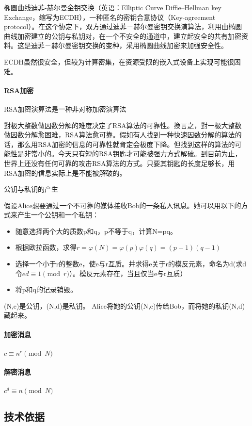 \documentclass{ctexart}
\begin{document}
椭圆曲线迪菲-赫尔曼金钥交换（英语：Elliptic Curve Diffie–Hellman key Exchange，缩写为ECDH），一种匿名的密钥合意协议（Key-agreement protocol）。在这个协定下，双方通过迪菲－赫尔曼密钥交换演算法，利用由椭圆曲线加密建立的公钥与私钥对，在一个不安全的通道中，建立起安全的共有加密资料。这是迪菲－赫尔曼密钥交换的变种，采用椭圆曲线加密来加强安全性。

ECDH虽然很安全，但较为计算密集，在资源受限的嵌入式设备上实现可能很困难。

\paragraph{RSA加密}
RSA加密演算法是一种非对称加密演算法

對极大整数做因数分解的难度决定了RSA算法的可靠性。換言之，對一极大整数做因数分解愈困难，RSA算法愈可靠。假如有人找到一种快速因数分解的算法的话，那么用RSA加密的信息的可靠性就肯定会极度下降。但找到这样的算法的可能性是非常小的。今天只有短的RSA钥匙才可能被强力方式解破。到目前为止，世界上还没有任何可靠的攻击RSA算法的方式。只要其钥匙的长度足够长，用RSA加密的信息实际上是不能被解破的。

公钥与私钥的产生

假设Alice想要通过一个不可靠的媒体接收Bob的一条私人讯息。她可以用以下的方式来产生一个公钥和一个私钥：

\begin{itemize}
	\item 随意选择两个大的质数p和q，p不等于q，计算N=pq。
	\item 根据欧拉函数，求得$r=\varphi (N) = \varphi (p)\varphi (q)=(p-1)(q-1)$
	\item 选择一个小于r的整数e，使e与r互质。并求得e关于r的模反元素，命名为d(求d令${\displaystyle ed\equiv 1{\pmod{r}}}$）。模反元素存在，当且仅当e与r互质）
	\item 将p和q的记录销毁。
\end{itemize}

(N,e)是公钥，(N,d)是私钥。 Alice将她的公钥(N,e)传给Bob，而将她的私钥(N,d)藏起来。

\paragraph{加密消息}
${\displaystyle c\equiv n^{e}{\pmod {N}}}$
\paragraph{解密消息}
${\displaystyle c^d\equiv n{\pmod {N}}}$
\subsection{技术依据}
\end{document}
